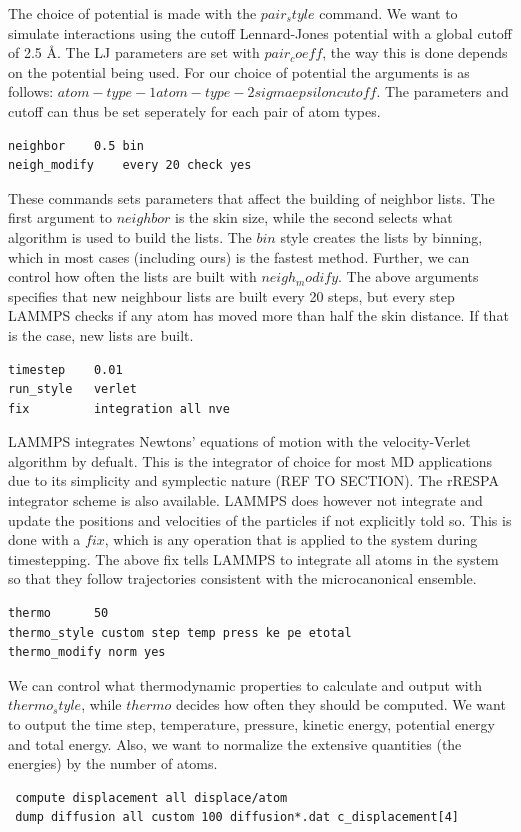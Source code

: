 \documentclass[twoside,english]{uiofysmaster}
\begin{document}
The choice of potential is made with the 
$pair_style$ command. We want to simulate
interactions using the cutoff Lennard-Jones potential
with a global cutoff of 2.5 Å. The LJ parameters
are set with $pair_coeff$, the way this is done
depends on the potential being used. For our
choice of potential the arguments is as follows:
$atom-type-1 atom-type-2 sigma epsilon cutoff$. 
The parameters and cutoff can thus be set seperately 
for each pair of atom types.
\begin{lstlisting}
neighbor	0.5 bin
neigh_modify	every 20 check yes
\end{lstlisting}
These commands sets parameters that affect the 
building of neighbor lists. The first argument
to $neighbor$ is the skin size, while the 
second selects what algorithm is used
to build the lists. The $bin$ style creates 
the lists by binning, which in most cases
(including ours) is the fastest method. 
Further, we can control how often the lists
are built with $neigh_modify$. The above arguments
specifies that new neighbour lists are built 
every 20 steps, but every step LAMMPS checks
if any atom has moved more than half the skin distance.
If that is the case, new lists are built. 
\begin{lstlisting}
timestep 	0.01
run_style 	verlet
fix 		integration all nve
\end{lstlisting}
LAMMPS integrates Newtons' equations of motion
with the velocity-Verlet algorithm by defualt. 
This is the integrator of choice for most MD
applications due to its simplicity and 
symplectic nature (REF TO SECTION). The 
rRESPA integrator \cite{Tuckerman92} scheme is also available.
LAMMPS does however not integrate and update
the positions and velocities of the particles
if not explicitly told so. This is done with
a $fix$, which is any operation that is applied to the 
system during timestepping. The above fix 
tells LAMMPS to integrate all atoms in the system 
so that they follow trajectories consistent with 
the microcanonical ensemble. 
\begin{lstlisting}
thermo		50
thermo_style custom step temp press ke pe etotal 
thermo_modify norm yes
\end{lstlisting}
We can control what thermodynamic properties 
to calculate and output with $thermo_style$, while 
$thermo$ decides how often they should be computed. 
We want to output the time step, temperature, 
pressure, kinetic energy, potential energy and total
energy. Also, we want to normalize the extensive
quantities (the energies) by the number of atoms. 
\begin{lstlisting}
 compute displacement all displace/atom
 dump diffusion all custom 100 diffusion*.dat c_displacement[4]
\end{lstlisting}
\end{document}
